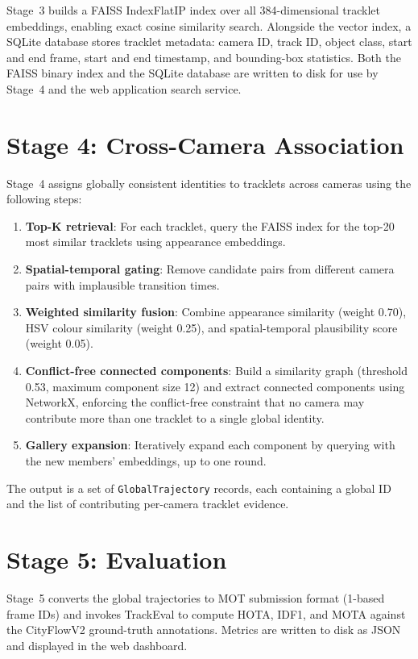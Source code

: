 Stage~3 builds a FAISS IndexFlatIP index over all 384-dimensional tracklet embeddings, enabling exact cosine similarity search. Alongside the vector index, a SQLite database stores tracklet metadata: camera ID, track ID, object class, start and end frame, start and end timestamp, and bounding-box statistics. Both the FAISS binary index and the SQLite database are written to disk for use by Stage~4 and the web application search service.

\section{Stage 4: Cross-Camera Association}

Stage~4 assigns globally consistent identities to tracklets across cameras using the following steps:

\begin{enumerate}
    \item \textbf{Top-K retrieval}: For each tracklet, query the FAISS index for the top-20 most similar tracklets using appearance embeddings.
    \item \textbf{Spatial-temporal gating}: Remove candidate pairs from different camera pairs with implausible transition times.
    \item \textbf{Weighted similarity fusion}: Combine appearance similarity (weight 0.70), HSV colour similarity (weight 0.25), and spatial-temporal plausibility score (weight 0.05).
    \item \textbf{Conflict-free connected components}: Build a similarity graph (threshold 0.53, maximum component size 12) and extract connected components using NetworkX, enforcing the conflict-free constraint that no camera may contribute more than one tracklet to a single global identity.
    \item \textbf{Gallery expansion}: Iteratively expand each component by querying with the new members' embeddings, up to one round.
\end{enumerate}

The output is a set of \texttt{GlobalTrajectory} records, each containing a global ID and the list of contributing per-camera tracklet evidence.

\section{Stage 5: Evaluation}

Stage~5 converts the global trajectories to MOT submission format (1-based frame IDs) and invokes TrackEval to compute HOTA, IDF1, and MOTA against the CityFlowV2 ground-truth annotations. Metrics are written to disk as JSON and displayed in the web dashboard.

